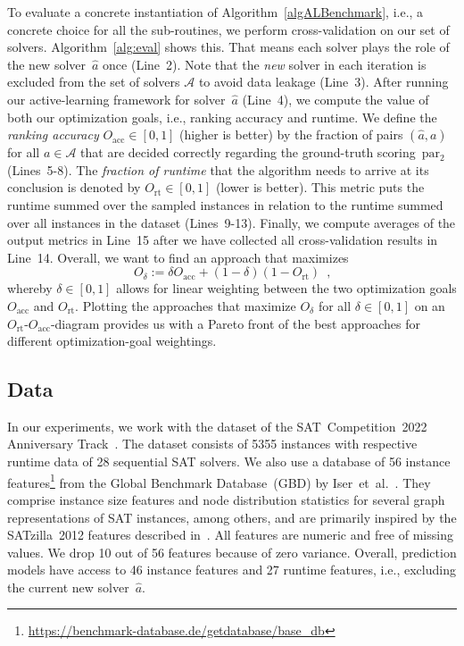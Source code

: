 \documentclass[runningheads]{llncs}
\begin{document}
To evaluate a concrete instantiation of Algorithm~\ref{algALBenchmark}, i.e., a concrete choice for all the sub-routines, we perform cross-validation on our set of solvers.
Algorithm~\ref{alg:eval} shows this.
That means each solver plays the role of the new solver~$\hat{a}$ once (Line~2).
Note that the \emph{new} solver in each iteration is excluded from the set of solvers $\mathcal{A}$ to avoid data leakage (Line~3).
After running our active-learning framework for solver~$\hat{a}$ (Line~4), we compute the value of both our optimization goals, i.e., ranking accuracy and runtime.
We define the \emph{ranking accuracy} $O_{\operatorname{acc}} \in \left[0, 1\right]$ (higher is better) by the fraction of pairs $\left(\hat{a}, a\right)$ for all $a \in \mathcal{A}$ that are decided correctly regarding the ground-truth scoring~$\operatorname{par_2}$ (Lines~5-8).
The \emph{fraction of runtime} that the algorithm needs to arrive at its conclusion is denoted by $O_{\operatorname{rt}} \in \left[0, 1\right]$ (lower is better).
This metric puts the runtime summed over the sampled instances in relation to the runtime summed over all instances in the dataset (Lines~9-13).
Finally, we compute averages of the output metrics in Line~15 after we have collected all cross-validation results in Line~14.
Overall, we want to find an approach that maximizes
%
\begin{equation}
  O_\delta := \delta O_{\operatorname{acc}} + \left(1 - \delta\right) \left(1 - O_{\operatorname{rt}}\right) \enspace \textrm{,}
  \label{eq:opt}
\end{equation} 
%
whereby $\delta \in \left[0, 1\right]$ allows for linear weighting between the two optimization goals $O_{\operatorname{acc}}$ and $O_{\operatorname{rt}}$.
Plotting the approaches that maximize $O_\delta$ for all $\delta \in \left[0, 1\right]$ on an $O_{\operatorname{rt}}$-$O_{\operatorname{acc}}$-diagram provides us with a Pareto front of the best approaches for different optimization-goal weightings.

\subsection{Data}
\label{sec:exdesign:data}

In our experiments, we work with the dataset of the SAT~Competition~2022 Anniversary Track~\cite{sat2022}.
The dataset consists of 5355 instances with respective runtime data of 28 sequential SAT solvers.
We also use a database of 56 instance features\footnote{\url{https://benchmark-database.de/getdatabase/base_db}} from the Global Benchmark Database~(GBD) by Iser~et~al.~\cite{IserS18}.
They comprise instance size features and node distribution statistics for several graph representations of SAT instances, among others, and are primarily inspired by the SATzilla~2012 features described in~\cite{features}.
All features are numeric and free of missing values.
We drop 10 out of 56 features because of zero variance.
Overall, prediction models have access to 46 instance features and 27 runtime features, i.e., excluding the current new solver~$\hat{a}$.
\end{document}
